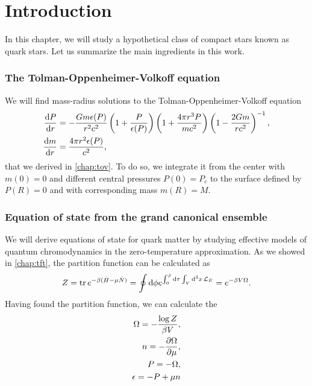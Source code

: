 \section{Introduction}


In this chapter, we will study a hypothetical class of compact stars known as quark stars.
Let us summarize the main ingredients in this work.

\subsubsection{The Tolman-Oppenheimer-Volkoff equation}

We will find mass-radius solutions to the Tolman-Oppenheimer-Volkoff equation
\begin{subequations}
\begin{align}
	\odv{P}{r} &= -\frac{G m \epsilon(P)}{r^2 c^2} \left( 1 + \frac{P}{\epsilon(P)} \right) \left( 1 + \frac{4 \pi r^3 P}{m c^2} \right) \left( 1 - \frac{2 G m}{r c^2} \right)^{-1} , \\
	\odv{m}{r} &= \frac{4 \pi r^2 \epsilon(P)}{c^2} ,
\end{align}
\end{subequations}
that we derived in \cref{chap:tov}.
To do so, we integrate it from the center with $m(0) = 0$ and different central pressures $P(0) = P_c$ to the surface defined by $P(R) = 0$ and with corresponding mass $m(R) = M$.

\subsubsection{Equation of state from the grand canonical ensemble}

We will derive equations of state for quark matter by studying effective models of quantum chromodynamics in the zero-temperature approximation.
As we showed in \cref{chap:tft}, the partition function can be calculated as
\begin{equation}
	Z = \operatorname{tr} e^{-\beta (\hat{H} - \mu \hat{N})} = \oint \mathop{}\!\mathrm{d} \phi e^{\int_0^\beta \mathop{}\!\mathrm{d} \tau \int_V \mathop{}\!\mathrm{d}^3 x \, \mathcal{L}_E } = e^{-\beta V \Omega} .
\end{equation}
Having found the partition function, we can calculate the
\begin{align}
	\Omega = -\frac{\log Z}{\beta V}, \\
	n = -\pdv{\Omega}{\mu}, \\
	P = -\Omega, \\
	\epsilon = -P + \mu n
\end{align}

